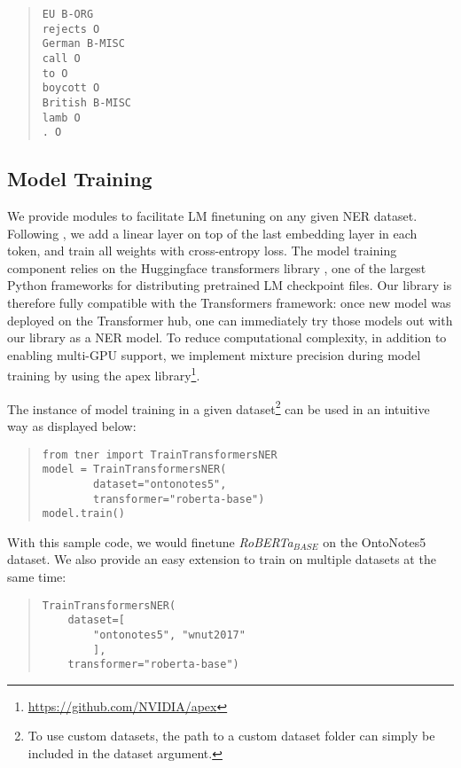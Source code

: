 \documentclass[11pt,a4paper]{article}
\begin{document}
\begin{quote}
\small
\begin{verbatim}
EU B-ORG
rejects O
German B-MISC
call O
to O
boycott O
British B-MISC
lamb O
. O
\end{verbatim}
\end{quote}

\subsection{Model Training}


We provide modules to facilitate LM finetuning on any given NER dataset. Following \citet{devlin2018bert}, we add a linear layer on top of the last embedding layer in each token, and train all weights with cross-entropy loss. The model training component relies on the Huggingface transformers library \citep{Wolf2019HuggingFacesTS}, one of the largest Python frameworks for distributing pretrained LM checkpoint files. Our library is therefore fully compatible with the Transformers framework: once new model was deployed on the Transformer hub, one can immediately try those models out with our library as a NER model.
To reduce computational complexity, in addition to enabling multi-GPU support, we implement mixture precision during model training by using the apex library\footnote{\url{https://github.com/NVIDIA/apex}}.

The instance of model training in a given dataset\footnote{To use custom datasets, the path to a custom dataset folder can simply be included in the dataset argument.} can be used in an intuitive way as displayed below: 
\begin{quote}
\small
\begin{verbatim}
from tner import TrainTransformersNER
model = TrainTransformersNER(
        dataset="ontonotes5",
        transformer="roberta-base")
model.train()
\end{verbatim}
\end{quote}
With this sample code, we would finetune {\it RoBERTa}$_{BASE}$ \citep{liu2019roberta} on the OntoNotes5 dataset. We also provide an easy extension to train on multiple datasets at the same time:
\begin{quote}
\small
\begin{verbatim}
TrainTransformersNER(
    dataset=[
        "ontonotes5", "wnut2017"
        ],
    transformer="roberta-base")
\end{verbatim}
\end{quote}
\end{document}
